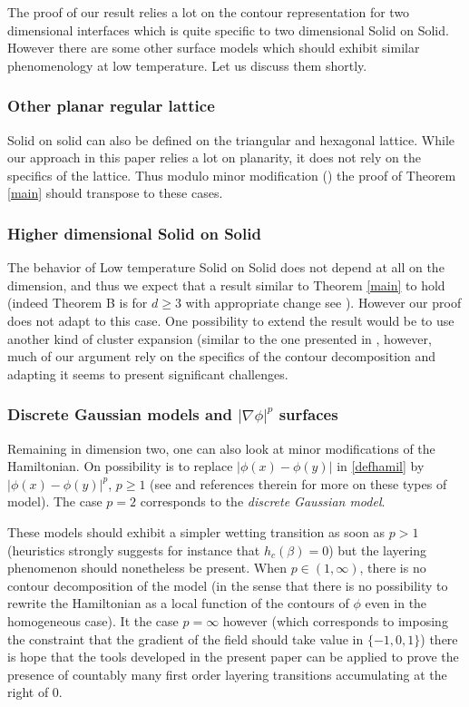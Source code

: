\documentclass[10pt]{amsart}
\numberwithin{equation}{section}
\theoremstyle{plain}
\theoremstyle{definition}
\begin{document}
The proof of our result relies a lot on the contour representation for
two dimensional interfaces which is quite specific to two dimensional Solid on Solid. However there are some other surface models which should exhibit similar phenomenology at low temperature. Let us discuss them shortly.

\subsubsection{Other planar regular lattice}

Solid on solid can also be defined on the triangular and hexagonal lattice. While our approach in this paper relies a lot on planarity, it does not rely on the specifics of the lattice. Thus modulo minor modification (\hbox{\cite[\S 2.4]{cf:part1}}) the proof of Theorem \ref{main} should transpose to these cases.

\subsubsection{Higher dimensional Solid on Solid}
The behavior of Low temperature Solid on Solid does not depend at all on the dimension, and thus we expect that a result similar to Theorem \ref{main} to hold (indeed Theorem B is for $d\ge 3$ with appropriate change see \cite[\S 2.4]{cf:part1}).
However our proof does not adapt to this case. One possibility to extend the result would be to use another kind of cluster expansion (similar to the one presented in \cite{cf:BM}, however, much of our argument rely on the specifics of the contour decomposition and adapting it seems to present significant challenges.\enlargethispage{\baselineskip}%

\subsubsection{ Discrete Gaussian models and $|\nabla \phi|^p$ surfaces}

Remaining in dimension two, one can also look at minor modifications of the Hamiltonian. On possibility is to replace $|\phi(x)-\phi(y)|$ in \eqref{defhamil} by $|\phi(x)-\phi(y)|^p$, $p\ge 1$ (see \eg \cite{cf:PFF} and references therein for more on these types of model).
The case $p=2$ corresponds to the \textit{discrete Gaussian model}.

These models should exhibit a simpler wetting transition as soon as $p>1$
(heuristics strongly suggests for instance that $h_c(\beta)=0$) but the layering phenomenon should nonetheless be present.
When $p\in (1,\infty)$, there is no contour decomposition of the model (in the sense that there is no possibility to rewrite the Hamiltonian as a local function of the contours of $\phi$ even in the homogeneous case).
It the case $p=\infty$ however (which corresponds to imposing the constraint that the gradient of the field should take value in $\{-1,0,1\}$) there is hope that the tools developed in the present paper can be applied to prove the presence of countably many first order layering transitions accumulating at the right of $0$.
\end{document}
